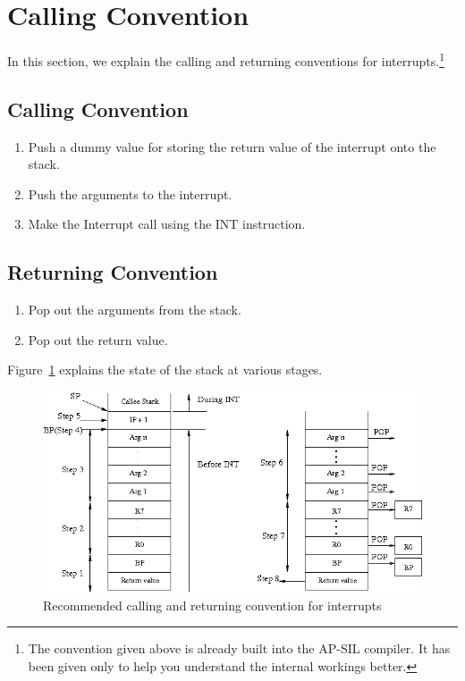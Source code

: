 
\section{Calling Convention}
\label{callconv}
In this section, we explain the calling and returning conventions for interrupts.\footnote{The convention given above is already built into the AP-SIL compiler. It has been given only to help you understand the internal workings better.}

\subsection{Calling Convention}
\begin{enumerate}
	\item Push a dummy value for storing the return value of the interrupt onto the stack.
	\item Push the arguments to the interrupt.
	\item Make the Interrupt call using the INT instruction.
\end{enumerate}
	
\subsection{Returning Convention}
\begin{enumerate}
	\item Pop out the arguments from the stack.
	\item Pop out the return value.
\end{enumerate}

Figure~\ref{fig:calling_convention} explains the state of the stack at various stages.

\begin{figure}[htp!]
	\centering
	\includegraphics[scale=0.55]{pics/calling_convention}
	\caption{Recommended calling and returning convention for interrupts}
	\label{fig:calling_convention}
\end{figure}
